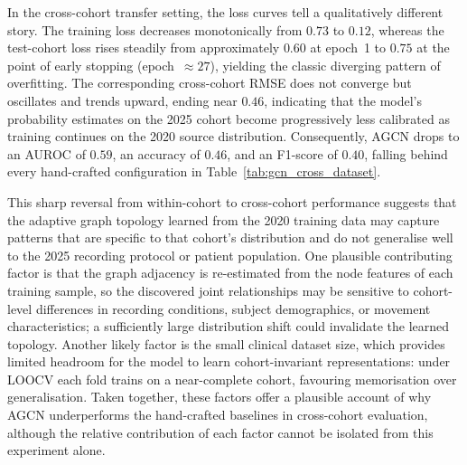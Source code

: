 In the cross-cohort transfer setting, the loss curves tell a qualitatively different story. The training loss decreases monotonically from $0.73$ to $0.12$, whereas the test-cohort loss rises steadily from approximately $0.60$ at epoch~1 to $0.75$ at the point of early stopping (epoch~$\approx 27$), yielding the classic diverging pattern of overfitting. The corresponding cross-cohort RMSE does not converge but oscillates and trends upward, ending near $0.46$, indicating that the model's probability estimates on the 2025 cohort become progressively less calibrated as training continues on the 2020 source distribution. Consequently, AGCN drops to an AUROC of $0.59$, an accuracy of $0.46$, and an F1-score of $0.40$, falling behind every hand-crafted configuration in Table~\ref{tab:gcn_cross_dataset}.

This sharp reversal from within-cohort to cross-cohort performance suggests that the adaptive graph topology learned from the 2020 training data may capture patterns that are specific to that cohort's distribution and do not generalise well to the 2025 recording protocol or patient population. One plausible contributing factor is that the graph adjacency is re-estimated from the node features of each training sample, so the discovered joint relationships may be sensitive to cohort-level differences in recording conditions, subject demographics, or movement characteristics; a sufficiently large distribution shift could invalidate the learned topology. Another likely factor is the small clinical dataset size, which provides limited headroom for the model to learn cohort-invariant representations: under LOOCV each fold trains on a near-complete cohort, favouring memorisation over generalisation. Taken together, these factors offer a plausible account of why AGCN underperforms the hand-crafted baselines in cross-cohort evaluation, although the relative contribution of each factor cannot be isolated from this experiment alone.
